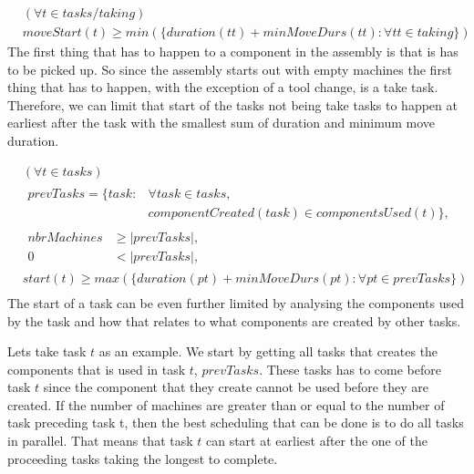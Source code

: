   \begin{equation}
  \begin{aligned}\label{eq:69}
  &(\forall t \in tasks / taking) \\
  &moveStart(t) \ge min(\{duration(tt) + minMoveDurs(tt) : \forall tt \in taking\})
  \end{aligned}
  \end{equation}
  The first thing that has to happen to a component in the assembly is that is has to be picked up. So since the assembly starts out with empty machines the first thing that has to happen, with the exception of a tool change, is a take task. Therefore, we can limit that start of the tasks not being take tasks to happen at earliest after the task with the smallest sum of duration and minimum move duration.
  
  \begin{equation}
  \begin{aligned}\label{eq:70}
  &(\forall t \in tasks)\\
  &\begin{aligned}
  prevTasks = \{task : &\forall task \in tasks,\\
  &componentCreated(task) \in componentsUsed(t)\},
  \end{aligned}\\
  &\begin{aligned}
  nbrMachines &\ge |prevTasks|,\\
  0 &< |prevTasks|,
  \end{aligned}\\
  &start(t) \ge max(\{duration(pt) + minMoveDurs(pt) : \forall pt \in prevTasks\}) \\
  \end{aligned}
  \end{equation}
  The start of a task can be even further limited by analysing the components used by the task and how that relates to what components are created by other tasks.
  
  Lets take task $t$ as an example. We start by getting all tasks that creates the components that is used in task $t$, $prevTasks$. These tasks has to come before task $t$ since the component that they create cannot be used before they are created. If the number of machines are greater than or equal to the number of task preceding task t, then the best scheduling that can be done is to do all tasks in parallel. That means that task $t$ can start at earliest after the one of the proceeding tasks taking the longest to complete.
  
